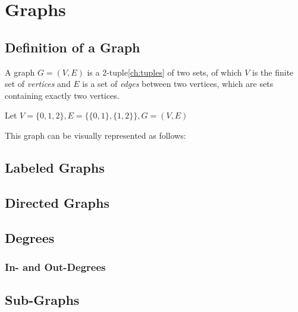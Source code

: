 \chapter{Graphs}\label{ch:graphs}
\section{Definition of a Graph}

\begin{definition}
  A graph \(G=(V, E)\) is a 2-tuple\ref{ch:tuples} of two sets, of which
  \(V\) is the finite set of \emph{vertices} and \(E\) is a set of \emph{edges}
  between two vertices, which are sets containing exactly two vertices.
\end{definition}

\begin{example}
  Let \(V=\{0,1,2\}, E=\{\{0,1\}, \{1,2\}\}, G=(V, E)\)

  This graph can be visually represented as follows:
  \linebreak
  \begin{center}
  \end{center}
\end{example}

\section{Labeled Graphs}

\section{Directed Graphs}

\section{Degrees}
\subsection{In- and Out-Degrees}

\section{Sub-Graphs}

